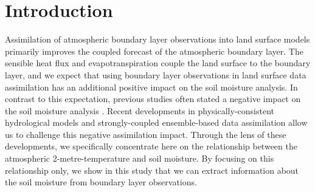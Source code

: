 \documentclass[HESSD, manuscript]{copernicus}
\begin{document}
%
\section{Introduction}
Assimilation of atmospheric boundary layer observations into land surface models primarily improves the coupled forecast of the atmospheric boundary layer.
The sensible heat flux and evapotranspiration couple the land surface to the boundary layer, and we expect that using boundary layer observations in land surface data assimilation has an additional positive impact on the soil moisture analysis.
In contrast to this expectation, previous studies often stated a negative impact on the soil moisture analysis \citep{hess_assimilation_2001, drusch_assimilation_2007, munozsabater_assimilation_2019, draper_root_2011, su_evaluation_2013, carrera_assimilation_2019}.
Recent developments in physically-consistent hydrological models \citep{fatichi_overview_2016,prein_review_2015,vereecken_modeling_2016} and strongly-coupled ensemble-based data assimilation \citep{sluka_assimilating_2016,penny_coupled_2017} allow us to challenge this negative assimilation impact.
Through the lens of these developments, we specifically concentrate here on the relationship between the atmospheric 2-metre-temperature and soil moisture.
By focusing on this relationship only, we show in this study that we can extract information about the soil moisture from boundary layer observations.
\end{document}
